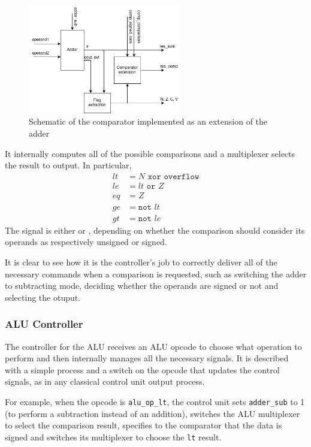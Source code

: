 \begin{figure}[htbp]
    \center
	\includegraphics[width=0.6\textwidth]{./2-implementation/images/comparator.png}
	\caption{Schematic of the comparator implemented as an extension of the adder}
	\label{fig:comparator}
\end{figure}

It internally computes all of the possible comparisons and a multiplexer selects the result to output. In particular,
\begin{align*}
    lt &= N \texttt{ xor } \texttt{overflow} \\
    le &= lt \texttt{ or } Z \\
    eq &= Z \\
    ge &= \texttt{not } lt \\
    gt &= \texttt{not } le
\end{align*}
The  signal is either  or ,
depending on whether the comparison should consider its operands as respectively unsigned or signed.

It is clear to see how it is the controller's job to correctly deliver all of the necessary commands when a comparison
is requested, such as switching the adder to subtracting mode, deciding whether the operands are signed or not and
selecting the otuput.

\subsubsection{ALU Controller}
The controller for the ALU receives an ALU opcode to choose what operation to perform and then internally manages all
the necessary signals. It is described with a simple process and a switch on the opcode that updates the control
signals, as in any classical control unit output process.

For example, when the opcode is \texttt{alu\_op\_lt}, the control unit sets \texttt{adder\_sub} to 1 (to perform a
subtraction instead of an addition), switches the ALU multiplexer to select the comparison result, specifies to the
comparator that the data is signed and switches its multiplexer to choose the \texttt{lt} result.

